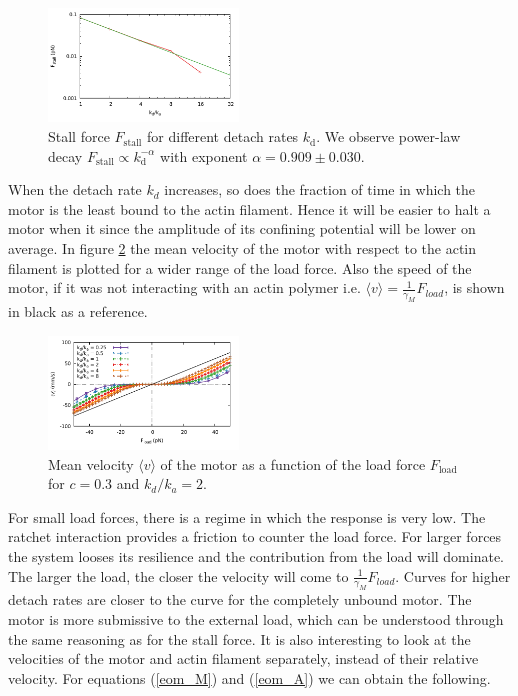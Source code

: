 \documentclass[aps,pre,twocolumn,showpacs,showkeys,a4paper]{revtex4}
\begin{document}
\begin{figure}[t]
\centering
\includegraphics[width=0.45\textwidth,height=!]{k_Fstall}
\caption{Stall force $F_\text{stall}$ for different detach rates $k_\text{d}$.
We observe power-law decay $F_\text{stall} \propto k_\text{d}^{-\alpha}$ with exponent $\alpha = 0.909 \pm 0.030$. 
}
\label{Fig: k_Fstall} 
\end{figure}
When the detach rate $k_{d}$ increases, so does the fraction of time in which the motor is the least bound to the actin filament. 
Hence it will be easier to halt a motor when it since the amplitude of its confining potential will be lower on average.
In figure \ref{Fig: F_v} the mean velocity of the motor with respect to the actin filament is plotted for a wider range of the load force. 
Also the speed of the motor, if it was not  interacting with an actin polymer i.e. $\langle v \rangle = \frac{1}{\gamma_M}F_{load}$, is shown in black as a reference.
\begin{figure}[b]
\centering
\includegraphics[width=0.45\textwidth,height=!]{F_v}
\caption{Mean velocity $\langle v \rangle$ of the motor as a function of the load force $F_\text{load}$ for $c=0.3$ and $k_d/k_a = 2$.}
\label{Fig: F_v} 
\end{figure}
For small load forces, there is a regime in which the response is very low. 
The ratchet interaction provides a friction to counter the load force. 
For larger forces the system looses its resilience and the contribution from the load will dominate. 
The larger the load, the closer the velocity will come to  $\frac{1}{\gamma_M}F_{load}$.
Curves for higher detach rates are closer to the curve for the completely unbound motor. 
The motor is more submissive to the external load, which can be understood through the same reasoning as for the stall force.
It is also interesting to look at the velocities of the motor and actin filament separately, instead of their relative velocity. 
For equations (\ref{eom_M}) and (\ref{eom_A}) we can obtain the following.
\end{document}
